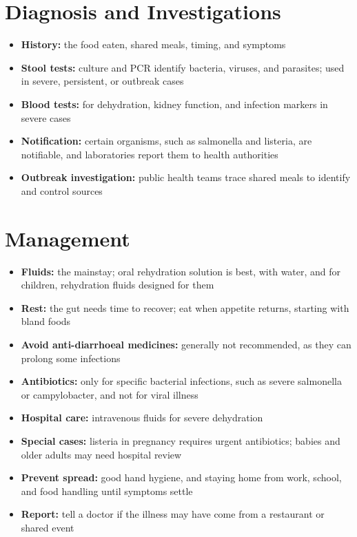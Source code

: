 \section*{Diagnosis and Investigations}
\begin{itemize}
    \item \textbf{History:} the food eaten, shared meals, timing, and symptoms
    \item \textbf{Stool tests:} culture and PCR identify bacteria, viruses, and parasites; used in severe, persistent, or outbreak cases
    \item \textbf{Blood tests:} for dehydration, kidney function, and infection markers in severe cases
    \item \textbf{Notification:} certain organisms, such as salmonella and listeria, are notifiable, and laboratories report them to health authorities
    \item \textbf{Outbreak investigation:} public health teams trace shared meals to identify and control sources
\end{itemize}

\section*{Management}
\begin{itemize}
    \item \textbf{Fluids:} the mainstay; oral rehydration solution is best, with water, and for children, rehydration fluids designed for them
    \item \textbf{Rest:} the gut needs time to recover; eat when appetite returns, starting with bland foods
    \item \textbf{Avoid anti-diarrhoeal medicines:} generally not recommended, as they can prolong some infections
    \item \textbf{Antibiotics:} only for specific bacterial infections, such as severe salmonella or campylobacter, and not for viral illness
    \item \textbf{Hospital care:} intravenous fluids for severe dehydration
    \item \textbf{Special cases:} listeria in pregnancy requires urgent antibiotics; babies and older adults may need hospital review
    \item \textbf{Prevent spread:} good hand hygiene, and staying home from work, school, and food handling until symptoms settle
    \item \textbf{Report:} tell a doctor if the illness may have come from a restaurant or shared event
\end{itemize}


